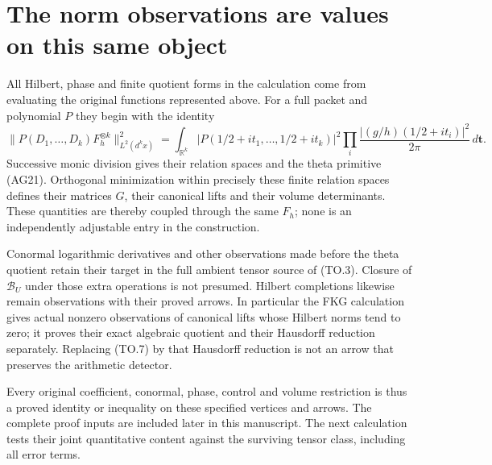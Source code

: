 \section{The norm observations are values on this same object}

All Hilbert, phase and finite quotient forms in the calculation
come from evaluating the original functions represented above.
For a full packet and polynomial $P$ they begin with the identity
\[
 \|P(D_1,\ldots,D_k)F_h^{\otimes k}\|_{L^2(d^kx)}^2
 =\int_{\mathbb R^k}|P(1/2+it_1,\ldots,1/2+it_k)|^2
       \prod_i\frac{|(g/h)(1/2+it_i)|^2}{2\pi}\,d\mathbf t.
 \tag{TO.10}
\]
Successive monic division gives their relation spaces and the
theta primitive (AG21).  Orthogonal minimization within precisely
these finite relation spaces defines their matrices $G$, their
canonical lifts and their volume determinants.  These quantities
are thereby coupled through the same $F_h$; none is an
independently adjustable entry in the construction.

Conormal logarithmic derivatives and other observations made
before the theta quotient retain their target in the full ambient
tensor source of (TO.3).  Closure of $\mathscr B_U$ under those
extra operations is not presumed.  Hilbert completions likewise
remain observations with their proved arrows.  In particular the
FKG calculation gives actual nonzero observations of canonical
lifts whose Hilbert norms tend to zero; it proves their exact
algebraic quotient and their Hausdorff reduction separately.
Replacing (TO.7) by that Hausdorff reduction is not an arrow
that preserves the arithmetic detector.

Every original coefficient, conormal, phase, control and volume
restriction is thus a proved identity or inequality on these
specified vertices and arrows.  The complete proof inputs are
included later in this manuscript.  The next calculation tests
their joint quantitative content against the surviving tensor
class, including all error terms.
